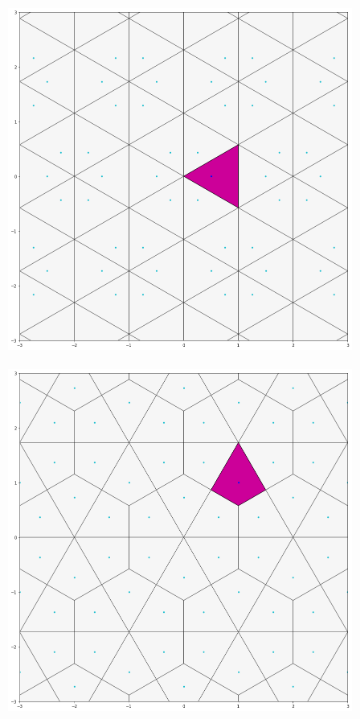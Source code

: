 \documentclass[12pt]{report}
\begin{document}
  \begin{figure}[H]
  \begin{subfigure}[b]{0.32\textwidth}
    \includegraphics[width=.9\textwidth]{dirihleov1.png}
    \label{fig:f1}
  \end{subfigure}
  \begin{subfigure}[b]{0.32\textwidth}
    \includegraphics[width=.9\textwidth]{dirihleov2.png}
    \label{fig:f2}

\end{subfigure}
\end{figure}
\end{document}
